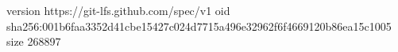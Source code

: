 version https://git-lfs.github.com/spec/v1
oid sha256:001b6faa3352d41cbe15427c024d7715a496e32962f6f4669120b86ea15c1005
size 268897
